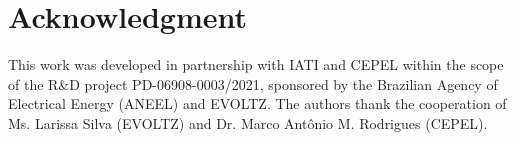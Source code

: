 \documentclass{IEEEtran4PSCC}
\begin{document}
\section*{Acknowledgment}

This work was developed  in partnership with IATI and CEPEL within the scope of the R\&D project PD-06908-0003/2021, sponsored by the Brazilian Agency of Electrical Energy (ANEEL) and EVOLTZ. The authors thank the cooperation of Ms. Larissa Silva (EVOLTZ) and Dr. Marco Antônio M. Rodrigues (CEPEL).


\nocite{*}

\end{document}
